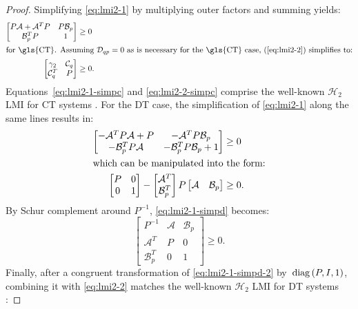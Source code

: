 \begin{proof}
	Simplifying \autoref{eq:lmi2-1} by multiplying outer factors and summing yields:
	\begin{align}
		\begin{bmatrix}
			P\mathcal{A} + \mathcal{A}^TP & P\mathcal{B}_p \\
			\mathcal{B}_p^TP & 1
		\end{bmatrix} &\geq 0 \label{eq:lmi2-1-simpc} \\
		\shortintertext{for \gls{CT}. Assuming $\mathcal{D}_{qp} = 0$ as is necessary for the \gls{CT} case, (\ref{eq:lmi2-2}) simplifies to:}
		\begin{bmatrix}
			\gamma_2 & \mathcal{C}_q \\
			\mathcal{C}_q^T & P
		\end{bmatrix} &\geq 0 \label{eq:lmi2-2-simpc}.
	\end{align}
	Equations~\ref{eq:lmi2-1-simpc} and \ref{eq:lmi2-2-simpc} comprise the well-known $\mathcal{H}_2$ \gls{LMI} for \gls{CT} systems \cite{Scherer1997, Masubuchi1998}. For the \gls{DT} case, the simplification of \autoref{eq:lmi2-1} along the same lines results in:
	\begin{align}
		\begin{bmatrix}
			-\mathcal{A}^TP\mathcal{A} + P & -\mathcal{A}^TP\mathcal{B}_p \\
			-\mathcal{B}_p^TP\mathcal{A} & -\mathcal{B}_p^TP\mathcal{B}_p + 1
		\end{bmatrix} &\geq 0 \\
		\shortintertext{which can be manipulated into the form:}
		\begin{bmatrix}
			P & 0 \\
			0 & 1
		\end{bmatrix} -
		\begin{bmatrix}
			\mathcal{A}^T \\
			\mathcal{B}_p^T
		\end{bmatrix} P
		\begin{bmatrix}
			\mathcal{A} & \mathcal{B}_p
		\end{bmatrix} &\geq 0 \label{eq:lmi2-1-simpd}.
	\end{align}
	By Schur complement around $P^{-1}$, \autoref{eq:lmi2-1-simpd} becomes:
	\begin{equation}
		\begin{bmatrix}
			P^{-1} & \mathcal{A} & \mathcal{B}_p \\
			\mathcal{A}^T & P & 0 \\
			\mathcal{B}_p^T & 0 & 1
		\end{bmatrix} \geq 0 \label{eq:lmi2-1-simpd-2}.
	\end{equation}
	Finally, after a congruent transformation of \autoref{eq:lmi2-1-simpd-2} by~$\operatorname{diag}\left(P, I, 1\right)$, combining it with \autoref{eq:lmi2-2} matches the well-known $\mathcal{H}_2$ \gls{LMI} for \gls{DT} systems \cite{Masubuchi1998}:
	

\end{proof}
